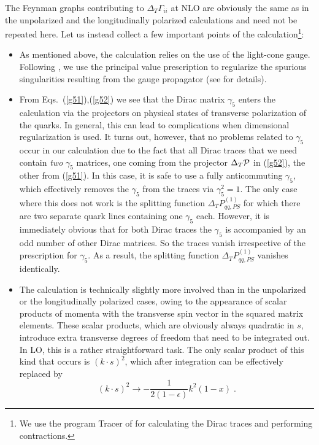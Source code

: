 The Feynman graphs contributing to $\Delta_T \Gamma_{ii}$ at NLO are
obviously the same as in the unpolarized and the longitudinally polarized 
calculations \cite{cfp,ev,wv} and need not be repeated here. Let us
instead collect a few important points of the calculation\footnote{We use the 
program {\sc Tracer} of \cite{trac} for calculating the Dirac traces and 
performing contractions.}:
\begin{itemize}
\item As mentioned above, the calculation relies on the use of the 
light-cone gauge. Following \cite{cfp,ev,wv}, we use the principal value
prescription to regularize the spurious singularities resulting from the  
gauge propagator (see \cite{ev} for details). 
\item From Eqs.~(\ref{g51}),(\ref{g52}) we see that the Dirac matrix
$\gamma_5$ enters the calculation via the projectors on physical 
states of transverse polarization of the quarks. In general, this can 
lead to complications when dimensional regularization is used. It turns
out, however, that no problems related to $\gamma_5$ occur in our 
calculation due to the fact that all Dirac traces that we need contain 
{\em two} $\gamma_5$ matrices, one coming from the projector $\Delta_T {\cal P}$ in 
(\ref{g52}), the other from (\ref{g51}). In this case, it is safe to use
a fully anticommuting $\gamma_5$, which effectively removes the $\gamma_5$
from the traces via $\gamma_5^2=1$. The only case where this does not work
is the splitting function $\Delta_T P_{qq,PS}^{(1)}$ for which there are two
separate quark lines containing one $\gamma_5$ each. However, it is 
immediately obvious that for both Dirac traces the $\gamma_5$ is accompanied 
by an odd number of other Dirac matrices. So the traces vanish irrespective 
of the prescription for $\gamma_5$. As a result, the splitting function 
$\Delta_T P_{qq,PS}^{(1)}$ vanishes identically.
\item The calculation is technically slightly more involved than in the
unpolarized or the longitudinally polarized cases, owing to the appearance
of scalar products of momenta with the transverse spin vector
in the squared matrix elements. These scalar products, which are
obviously always quadratic in $s$, introduce extra transverse
degrees of freedom that need to be integrated out. In LO, this is a
rather straightforward task. The only scalar product of this kind that
occurs is $(k\cdot s)^2$, which after integration can be effectively
replaced by
\begin{equation} \label{repl1}
(k \cdot s)^2 \rightarrow -\frac{1}{2 (1-\epsilon)} k^2 (1-x) \; .

\end{equation}
\end{itemize}
